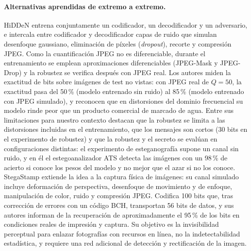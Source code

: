 \documentclass[IB]{TFUOC}%
\begin{document}
\paragraph{Alternativas aprendidas de extremo a extremo.} HiDDeN \cite{zhu2018hidden} entrena conjuntamente un codificador, un decodificador y un adversario, e intercala entre codificador y decodificador capas de ruido que simulan desenfoque gaussiano, eliminación de píxeles (\textit{dropout}), recorte y compresión JPEG. Como la cuantificación JPEG no es diferenciable, durante el entrenamiento se emplean aproximaciones diferenciables (JPEG-Mask y JPEG-Drop) y la robustez se verifica después con JPEG real. Los autores miden la exactitud de bits sobre imágenes de test no vistas: con JPEG real de $Q=50$, la exactitud pasa del 50\,\% (modelo entrenado sin ruido) al 85\,\% (modelo entrenado con JPEG simulado), y reconocen que en distorsiones del dominio frecuencial su modelo rinde peor que un producto comercial de marcado de agua. Entre sus limitaciones para nuestro contexto destacan que la robustez se limita a las distorsiones incluidas en el entrenamiento, que los mensajes son cortos (30 bits en el experimento de robustez) y que la robustez y el secreto se evalúan en configuraciones distintas: el experimento de esteganografía supone un canal sin ruido, y en él el estegoanalizador ATS \cite{lerch2016ats} detecta las imágenes con un 98\,\% de acierto si conoce los pesos del modelo y no mejor que el azar si no los conoce. StegaStamp \cite{tancik2020stegastamp} extiende la idea a la captura física de imágenes: su canal simulado incluye deformación de perspectiva, desenfoque de movimiento y de enfoque, manipulación de color, ruido y compresión JPEG. Codifica 100 bits que, tras corrección de errores con un código BCH, transportan 56 bits de datos, y sus autores informan de la recuperación de aproximadamente el 95\,\% de los bits en condiciones reales de impresión y captura. Su objetivo es la invisibilidad perceptual para enlazar fotografías con recursos en línea, no la indetectabilidad estadística, y requiere una red adicional de detección y rectificación de la imagen.
\end{document}

